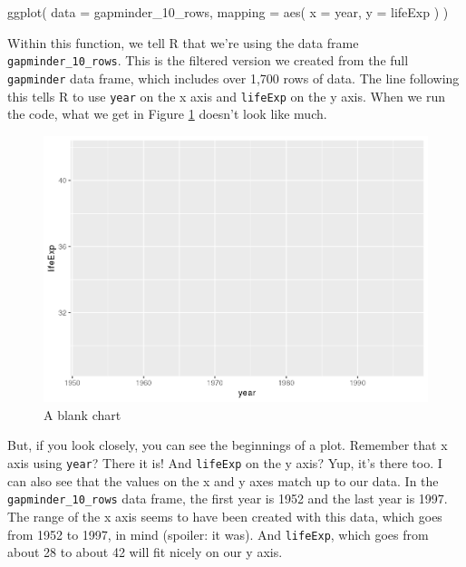 \documentclass[
]{book}
\newenvironment{Shaded}{\begin{snugshade}}{\end{snugshade}}
\newcommand{\AttributeTok}[1]{\textcolor[rgb]{0.77,0.63,0.00}{#1}}
\newcommand{\FunctionTok}[1]{\textcolor[rgb]{0.00,0.00,0.00}{#1}}
\newcommand{\NormalTok}[1]{#1}
\begin{document}
\begin{Shaded}
\begin{Highlighting}[]
\FunctionTok{ggplot}\NormalTok{(}
  \AttributeTok{data =}\NormalTok{ gapminder\_10\_rows,}
  \AttributeTok{mapping =} \FunctionTok{aes}\NormalTok{(}
    \AttributeTok{x =}\NormalTok{ year,}
    \AttributeTok{y =}\NormalTok{ lifeExp}
\NormalTok{  )}
\NormalTok{)}
\end{Highlighting}
\end{Shaded}

Within this function, we tell R that we're using the data frame \texttt{gapminder\_10\_rows}. This is the filtered version we created from the full \texttt{gapminder} data frame, which includes over 1,700 rows of data. The line following this tells R to use \texttt{year} on the x axis and \texttt{lifeExp} on the y axis. When we run the code, what we get in Figure \ref{fig:blank-ggplot} doesn't look like much.

\begin{figure}
\includegraphics[width=1\linewidth]{data-viz_files/figure-latex/blank-ggplot-1} \caption{A blank chart}\label{fig:blank-ggplot}
\end{figure}

But, if you look closely, you can see the beginnings of a plot. Remember that x axis using \texttt{year}? There it is! And \texttt{lifeExp} on the y axis? Yup, it's there too. I can also see that the values on the x and y axes match up to our data. In the \texttt{gapminder\_10\_rows} data frame, the first year is 1952 and the last year is 1997. The range of the x axis seems to have been created with this data, which goes from 1952 to 1997, in mind (spoiler: it was). And \texttt{lifeExp}, which goes from about 28 to about 42 will fit nicely on our y axis.
\end{document}
